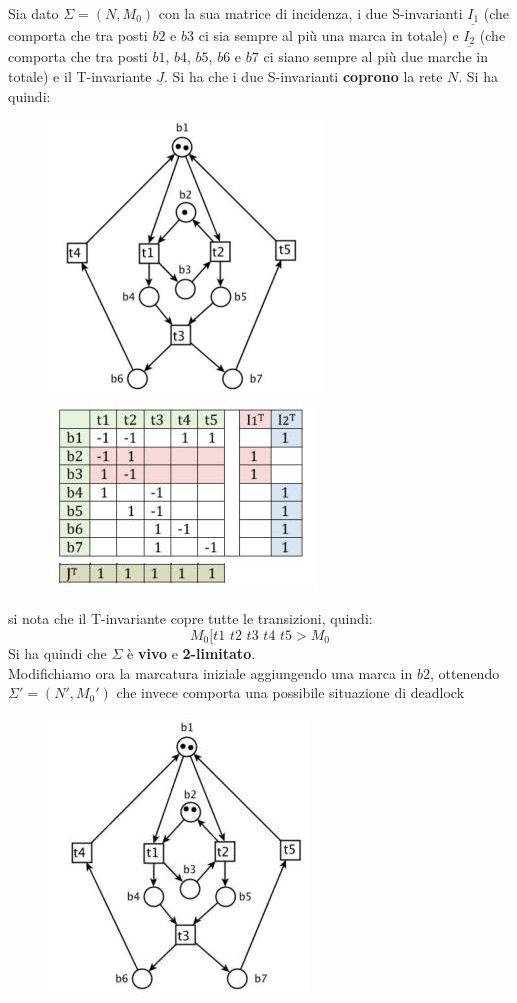 \documentclass[a4paper,12pt, oneside]{book}
\begin{document}
\begin{esempio}
  Sia dato $\Sigma = (N,M_0)$ con la sua matrice di incidenza, i due
  S-invarianti $\underline{I_1}$ (che comporta che tra posti $b2$ e $b3$ ci sia
  sempre al più una marca in totale) e $\underline{I_2}$ (che comporta che tra
  posti $b1$, $b4$, $b5$, $b6$ e $b7$ ci siano sempre al più due marche in
  totale) e il T-invariante $\underline{J}$. Si ha che i due S-invarianti
  \textbf{coprono} la rete $N$. Si ha quindi:
  \begin{figure}[H]
    \centering
    \includegraphics[scale = 0.55]{img/es1.jpg}
    \includegraphics[scale = 0.55]{img/es2.jpg}    
  \end{figure}
  si nota che il T-invariante copre tutte le transizioni, quindi:
  \[M_0 [t1\,\,t2\,\,t3\,\,t4\,\, t5 > M_0\]
  Si ha quindi che $\Sigma$ è \textbf{vivo} e \textbf{2-limitato}.\\
  Modifichiamo ora la marcatura iniziale aggiungendo una marca in $b2$,
  ottenendo $\Sigma' = (N',M_0')$ che invece comporta una possibile situazione
  di deadlock
  \begin{figure}[H]
    \centering
    \includegraphics[scale = 0.435]{img/es3.jpg}

\end{figure}
\end{esempio}
\end{document}
